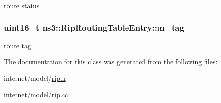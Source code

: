 route status 

\subsubsection[{\texorpdfstring{m\+\_\+tag}{m_tag}}]{\setlength{\rightskip}{0pt plus 5cm}uint16\+\_\+t ns3\+::\+Rip\+Routing\+Table\+Entry\+::m\+\_\+tag\hspace{0.3cm}{\ttfamily [private]}}\hypertarget{classns3_1_1RipRoutingTableEntry_af1d92d746099aff8abb60912a9137630}{}\label{classns3_1_1RipRoutingTableEntry_af1d92d746099aff8abb60912a9137630}


route tag 



The documentation for this class was generated from the following files\+:\begin{DoxyCompactItemize}
\item 
internet/model/\hyperlink{rip_8h}{rip.\+h}\item 
internet/model/\hyperlink{rip_8cc}{rip.\+cc}\end{DoxyCompactItemize}
